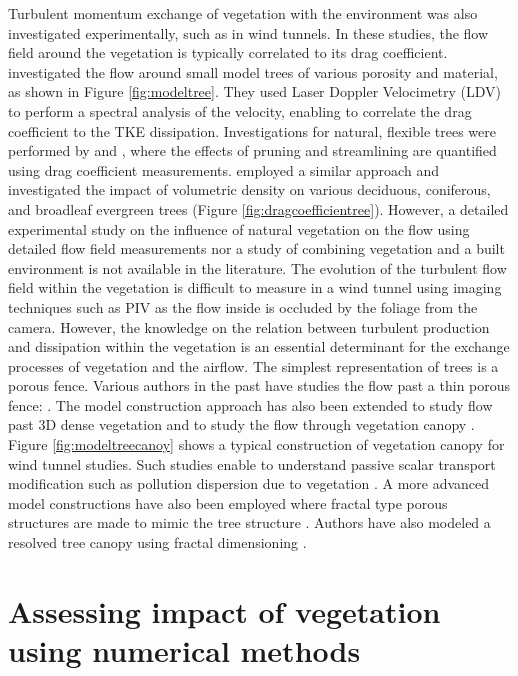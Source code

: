 Turbulent momentum exchange of vegetation with the environment was also investigated experimentally, such as in wind tunnels. In these studies, the flow field around the vegetation is typically correlated to its drag coefficient. \cite{Gromke2008a} investigated the flow around small model trees of various porosity and material, as shown in Figure \ref{fig:modeltree}. They used Laser Doppler Velocimetry (LDV) to perform a spectral analysis of the velocity, enabling to correlate the drag coefficient to the TKE dissipation. Investigations for natural, flexible trees were performed by \cite{Rudnicki2004} and \cite{Vollsinger2005}, where the effects of pruning and streamlining are quantified using drag coefficient measurements. \cite{Cao2012} employed a similar approach and investigated the impact of volumetric density on various deciduous, coniferous, and broadleaf evergreen trees (Figure \ref{fig:dragcoefficientree}). However, a detailed experimental study on the influence of natural vegetation on the flow using detailed flow field measurements nor a study of combining vegetation and a built environment is not available in the literature. The evolution of the turbulent flow field within the vegetation is difficult to measure in a wind tunnel using imaging techniques such as PIV as the flow inside is occluded by the foliage from the camera. However, the knowledge on the relation between turbulent production and dissipation within the vegetation is an essential determinant for the exchange processes of vegetation and the airflow. The simplest representation of trees is a porous fence. Various authors in the past have studies the flow past a thin porous fence: \citep{Gandemer1979, Dong2010, Perera1981,Hagen1971,Conan2015}. The model construction approach has also been extended to study flow past 3D dense vegetation and to study the flow through vegetation canopy \citep{Conan2015,Poggi2004}. Figure \ref{fig:modeltreecanoy} shows a typical construction of vegetation canopy for wind tunnel studies. Such studies enable to understand passive scalar transport modification such as pollution dispersion due to vegetation \citep{Gromke2011,Gromke2008}. A more advanced model constructions have also been employed where fractal type porous structures are made to mimic the tree structure \citep{McClure2017}. Authors have also modeled a resolved tree canopy using fractal dimensioning \citep{Bai2012,Bai2014a}. 

\section{Assessing impact of vegetation using numerical methods}

